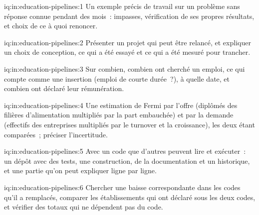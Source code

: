 \begin{solution}{iq:in:education-pipelines:1}
Un exemple précis de travail sur un problème sans réponse connue pendant des mois~: impasses, vérification de ses propres
résultats, et choix de ce à quoi renoncer.
\end{solution}

\begin{solution}{iq:in:education-pipelines:2}
Présenter un projet qui peut être relancé, et expliquer un choix de conception, ce qui a été essayé et ce qui a été mesuré pour trancher.
\end{solution}

\begin{solution}{iq:in:education-pipelines:3}
Sur combien, combien ont cherché un emploi, ce qui compte comme une insertion (emploi de courte durée~?), à quelle date, et
combien ont déclaré leur rémunération.
\end{solution}

\begin{solution}{iq:in:education-pipelines:4}
Une estimation de Fermi par l'offre (diplômés des filières d'alimentation multipliés par la part embauchée) et par la
demande (effectifs des entreprises multipliés par le turnover et la croissance), les deux étant comparées~; préciser l'incertitude.
\end{solution}

\begin{solution}{iq:in:education-pipelines:5}
Avec un code que d'autres peuvent lire et exécuter~: un dépôt avec des tests, une construction, de la documentation et un historique, et une
partie qu'on peut expliquer ligne par ligne.
\end{solution}

\begin{solution}{iq:in:education-pipelines:6}
Chercher une baisse correspondante dans les codes qu'il a remplacés, comparer les établissements qui ont déclaré sous les deux codes, et vérifier des totaux qui
ne dépendent pas du code.
\end{solution}
